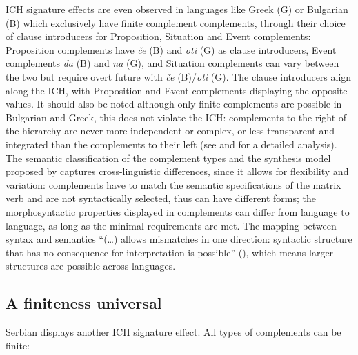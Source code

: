 \documentclass[output=paper]{langscibook}
\begin{document}
ICH signature effects are even observed in languages like Greek (G) or Bulgarian (B) which exclusively have finite complement complements, through their choice of clause introducers for Proposition, Situation and Event complements: Proposition complements have \emph{če} (B) and \emph{oti} (G) as clause introducers, Event complements \emph{da} (B) and \emph{na} (G), and Situation complements can vary between the two but require overt future with \emph{če} (B)/\emph{oti} (G). The clause introducers align along the ICH, with Proposition and Event complements displaying the opposite values. It should also be noted although only finite complements are possible in Bulgarian and Greek, this does not violate the ICH: complements to the right of the hierarchy are never more independent or complex, or less transparent and integrated than the complements to their left (see \citet{wurmbrandlohninger2020}  and \citet{wurmbrandetal2020}  for a detailed analysis). The semantic classification of the complement types and the synthesis model proposed by \citet{wurmbrandlohninger2020} captures cross-linguistic differences, since it allows for flexibility and variation: complements have to match the semantic specifications of the matrix verb and are not syntactically selected, thus can have different forms; the morphosyntactic properties displayed in complements can differ from language to language, as long as the minimal requirements are met. The mapping between syntax and semantics “(…) allows mismatches in one direction: syntactic structure that has no consequence for interpretation is possible” (\citealt{wurmbrandlohninger2020}), which means larger structures are possible across languages. 

\subsection{A finiteness universal}
\label{Paj1.3}

Serbian displays another ICH signature effect. All types of complements can be finite:
\end{document}
